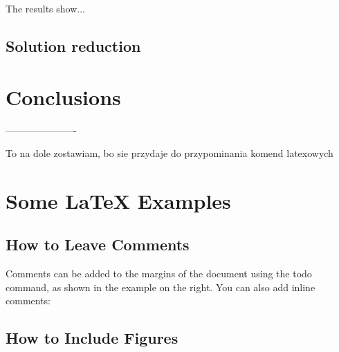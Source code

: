 \documentclass[a4paper]{article}
\begin{document}
\begin{table}[h]
\centering
\caption{Tournament selection}
\label{table:tournament}
\end{table}

The results show...

\subsection{Solution reduction}


\section{Conclusions}


----------------------

To na dole zostawiam, bo sie przydaje do przypominania komend latexowych



\section{Some \LaTeX{} Examples}
\label{sec:examples}

\subsection{How to Leave Comments}

Comments can be added to the margins of the document using the  todo command, as shown in the example on the right. You can also add inline comments:


\subsection{How to Include Figures}
\end{document}

